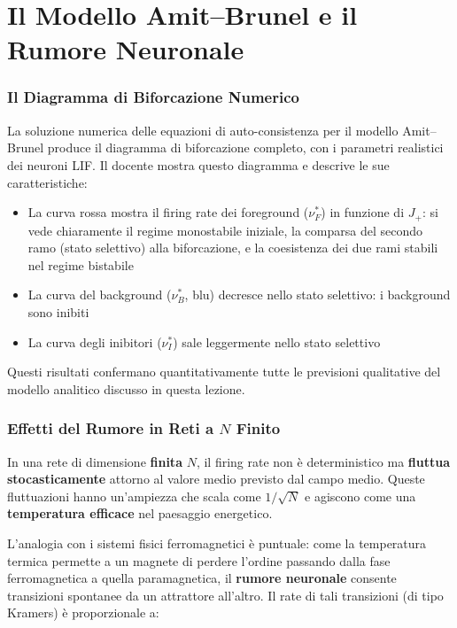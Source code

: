 \section{Il Modello Amit–Brunel e il Rumore Neuronale}

\subsubsection{Il Diagramma di Biforcazione Numerico}

La soluzione numerica delle equazioni di auto-consistenza per il modello Amit–Brunel produce il diagramma di biforcazione completo, con i parametri realistici dei neuroni LIF. Il docente mostra questo diagramma e descrive le sue caratteristiche:

\begin{itemize}
    \item La curva rossa mostra il firing rate dei foreground ($\nu_F^*$) in funzione di $J_+$: si vede chiaramente il regime monostabile iniziale, la comparsa del secondo ramo (stato selettivo) alla biforcazione, e la coesistenza dei due rami stabili nel regime bistabile
    \item La curva del background ($\nu_B^*$, blu) decresce nello stato selettivo: i background sono inibiti
    \item La curva degli inibitori ($\nu_I^*$) sale leggermente nello stato selettivo
\end{itemize}

Questi risultati confermano quantitativamente tutte le previsioni qualitative del modello analitico discusso in questa lezione.

\subsubsection{Effetti del Rumore in Reti a $N$ Finito}

In una rete di dimensione \textbf{finita} $N$, il firing rate non è deterministico ma \textbf{fluttua stocasticamente} attorno al valore medio previsto dal campo medio. Queste fluttuazioni hanno un'ampiezza che scala come $1/\sqrt{N}$ e agiscono come una \textbf{temperatura efficace} nel paesaggio energetico.

L'analogia con i sistemi fisici ferromagnetici è puntuale: come la temperatura termica permette a un magnete di perdere l'ordine passando dalla fase ferromagnetica a quella paramagnetica, il \textbf{rumore neuronale} consente transizioni spontanee da un attrattore all'altro. Il rate di tali transizioni (di tipo Kramers) è proporzionale a:

